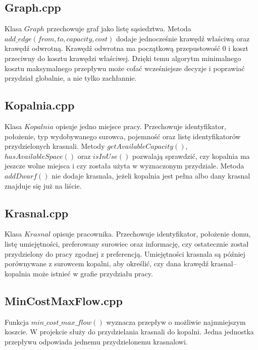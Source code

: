 \documentclass{article}
\begin{document}
\subsection{Graph.cpp}
Klasa $Graph$ przechowuje graf jako listę sąsiedztwa. Metoda $add\_edge(from, to, capacity, cost)$ dodaje jednocześnie krawędź właściwą oraz krawędź odwrotną. Krawędź odwrotna ma początkową przepustowość $0$ i koszt przeciwny do kosztu krawędzi właściwej. Dzięki temu algorytm minimalnego kosztu maksymalnego przepływu może cofać wcześniejsze decyzje i poprawiać przydział globalnie, a nie tylko zachłannie.



\subsection{Kopalnia.cpp}
Klasa $Kopalnia$ opisuje jedno miejsce pracy. Przechowuje identyfikator, położenie, typ wydobywanego surowca, pojemność oraz listę identyfikatorów przydzielonych krasnali. Metody $getAvailableCapacity()$, $hasAvailableSpace()$ oraz $isInUse()$ pozwalają sprawdzić, czy kopalnia ma jeszcze wolne miejsca i czy została użyta w wyznaczonym przydziale. Metoda $addDwarf()$ nie dodaje krasnala, jeżeli kopalnia jest pełna albo dany krasnal znajduje się już na liście.



\subsection{Krasnal.cpp}
Klasa $Krasnal$ opisuje pracownika. Przechowuje identyfikator, położenie domu, listę umiejętności, preferowany surowiec oraz informację, czy ostatecznie został przydzielony do pracy zgodnej z preferencją. Umiejętności krasnala są później porównywane z surowcem kopalni, aby określić, czy dana krawędź krasnal--kopalnia może istnieć w grafie przydziału pracy.



\subsection{MinCostMaxFlow.cpp}
Funkcja $min\_cost\_max\_flow()$ wyznacza przepływ o możliwie najmniejszym koszcie. W projekcie służy do przydzielania krasnali do kopalni. Jedna jednostka przepływu odpowiada jednemu przydzielonemu krasnalowi.
\end{document}
